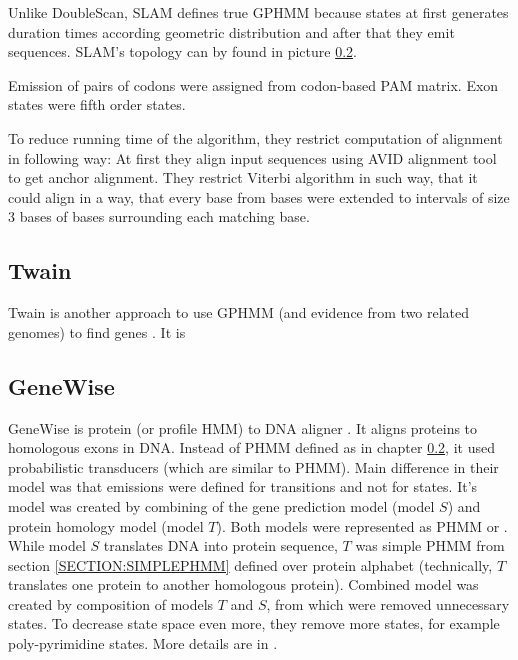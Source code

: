 Unlike DoubleScan, SLAM defines true GPHMM because states at first generates
duration times according geometric distribution and after that they emit
sequences. SLAM's topology can by found in picture \ref{}. 

Emission of pairs of codons were assigned from codon-based PAM matrix. Exon
states were fifth order states.

To reduce running time of the algorithm, they restrict computation of alignment
in following way: At first they  align input sequences using AVID alignment
tool\cite{} to get anchor alignment. They restrict Viterbi algorithm in such
way, that it could align  in a way, that every base from  bases were extended to
intervals of size $3$ bases of bases surrounding each matching base.



\subsection{Twain}

Twain is another approach to use GPHMM (and evidence from two related genomes)
to find genes \cite{Majoros2005}. It is 



\subsection{GeneWise}

GeneWise is protein (or profile HMM) to DNA aligner \cite{GeneWise2004}. It aligns
proteins to homologous exons in DNA. Instead of PHMM defined as in chapter
\ref{}, it used probabilistic transducers (which are similar to PHMM). Main
difference in their model was that emissions were defined for transitions and
not for states.  It's model was created by combining of the gene prediction
model (model $S$) and protein homology model (model $T$). Both models were
represented as PHMM or . While model $S$ translates DNA into protein sequence, $T$ was simple PHMM
from section \ref{SECTION:SIMPLEPHMM} defined over protein alphabet
(technically, $T$ translates one protein to another homologous protein).
Combined model was created by composition of models $T$ and $S$, from which were
removed unnecessary states. To decrease state space even more, they remove more
states, for example poly-pyrimidine states. More details are in
\cite{GeneWise2004}.

